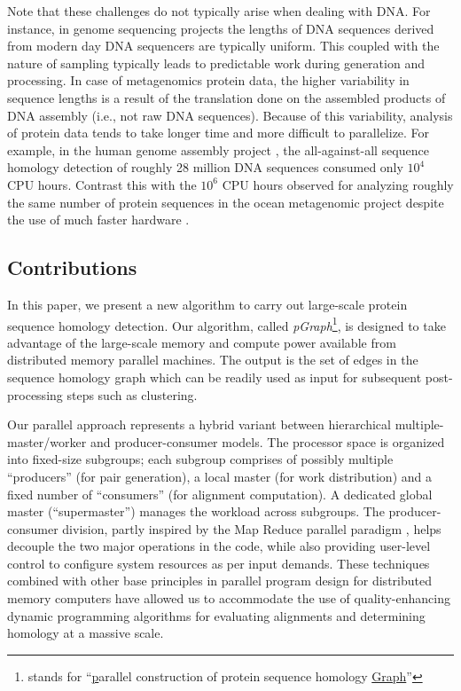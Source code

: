 \documentclass[10pt,journal,letterpaper,compsoc]{IEEEtran}
\begin{document}
Note that these challenges do not typically arise when dealing with DNA. For instance, in genome sequencing projects the lengths of DNA sequences derived from modern day DNA sequencers are typically uniform. This coupled with the nature of sampling typically leads to predictable work during generation and processing. In case of metagenomics protein data, the higher variability in sequence lengths is a result of the translation done on the assembled products of DNA assembly (i.e., not raw DNA sequences). Because of this variability, analysis of protein data tends to take longer time and more difficult to parallelize. For example, in the human genome assembly project \cite{Venter01}, the all-against-all sequence homology detection of roughly 28 million DNA sequences consumed only $10^4$ CPU hours. Contrast this with the $10^6$ CPU hours observed for analyzing roughly the same number of protein sequences in the ocean metagenomic project despite the use of much faster hardware \cite{Yooseph07}.


\subsection{Contributions}
\label{secContributions}


In this paper, we present a new algorithm to carry out large-scale protein sequence homology detection. Our algorithm, called {\it pGraph}\footnote{stands for ``\underline{p}arallel construction of protein sequence homology \underline{Graph}''}, is designed to take advantage of the large-scale memory and compute power available from distributed memory parallel machines. The output is the set of edges in the sequence homology graph which can be readily used as input for subsequent post-processing steps such as clustering. 

Our parallel approach represents a hybrid variant between hierarchical multiple-master/worker and producer-consumer models. The processor space is organized into fixed-size subgroups; each subgroup comprises of possibly multiple ``producers'' (for pair generation), a local master (for work distribution) and a fixed number of ``consumers'' (for alignment computation). A dedicated global master (``supermaster'') manages the workload across subgroups. The producer-consumer division, partly inspired by the Map Reduce parallel paradigm \cite{Dean08}, helps decouple the two major operations in the code, while also providing user-level control to configure system resources as per input demands. These techniques combined with other base principles in parallel program design for distributed memory computers have allowed us to accommodate the use of quality-enhancing dynamic programming algorithms for evaluating alignments and determining homology at a massive scale. 
\end{document}
